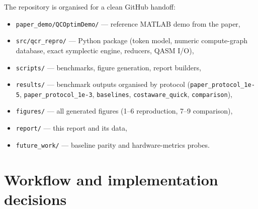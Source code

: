 \documentclass[11pt,a4paper]{article}
\begin{document}
The repository is organised for a clean GitHub handoff:
\begin{itemize}
    \item \texttt{paper\_demo/QCOptimDemo/} --- reference MATLAB demo from the paper,
    \item \texttt{src/qcr\_repro/} --- Python package (token model, numeric
      compute-graph database, exact symplectic engine, reducers, QASM I/O),
    \item \texttt{scripts/} --- benchmarks, figure generation, report builders,
    \item \texttt{results/} --- benchmark outputs organised by protocol
      (\texttt{paper\_protocol\_1e-5}, \texttt{paper\_protocol\_1e-3},
      \texttt{baselines}, \texttt{costaware\_quick}, \texttt{comparison}),
    \item \texttt{figures/} --- all generated figures (1--6 reproduction, 7--9 comparison),
    \item \texttt{report/} --- this report and its data,
    \item \texttt{future\_work/} --- baseline parity and hardware-metrics probes.
\end{itemize}

\section{Workflow and implementation decisions}
\end{document}
